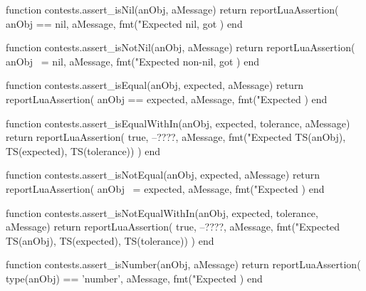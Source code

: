 \stopTestSuite


\startLuaCode
function contests.assert_isNil(anObj, aMessage)
  return reportLuaAssertion(
    anObj == nil,
    aMessage,
    fmt("Expected nil, got %
  )
end
\stopLuaCode

\stopTestSuite


\startLuaCode
function contests.assert_isNotNil(anObj, aMessage)
  return reportLuaAssertion(
    anObj ~= nil,
    aMessage,
    fmt("Expected non-nil, got %
  )
end
\stopLuaCode

\stopTestSuite


\startLuaCode
function contests.assert_isEqual(anObj, expected, aMessage)
  return reportLuaAssertion(
    anObj == expected,
    aMessage,
    fmt("Expected %
  )
end
\stopLuaCode

\stopTestSuite


\startLuaCode
function contests.assert_isEqualWithIn(anObj, expected, tolerance, aMessage)
  return reportLuaAssertion(
    true, --????,
    aMessage,
    fmt("Expected %
      TS(anObj), TS(expected), TS(tolerance))
  )
end
\stopLuaCode

\stopTestSuite


\startLuaCode
function contests.assert_isNotEqual(anObj, expected, aMessage)
  return reportLuaAssertion(
    anObj ~= expected,
    aMessage,
    fmt("Expected %
  )
end
\stopLuaCode

\stopTestSuite

\startLuaCode
function contests.assert_isNotEqualWithIn(anObj, expected, tolerance, aMessage)
  return reportLuaAssertion(
    true, --????,
    aMessage,
    fmt("Expected %
      TS(anObj), TS(expected), TS(tolerance))
  )
end
\stopLuaCode

\stopTestSuite


\startLuaCode
function contests.assert_isNumber(anObj, aMessage)
  return reportLuaAssertion(
    type(anObj) == 'number',
    aMessage,
    fmt("Expected %
  )
end
\stopLuaCode

